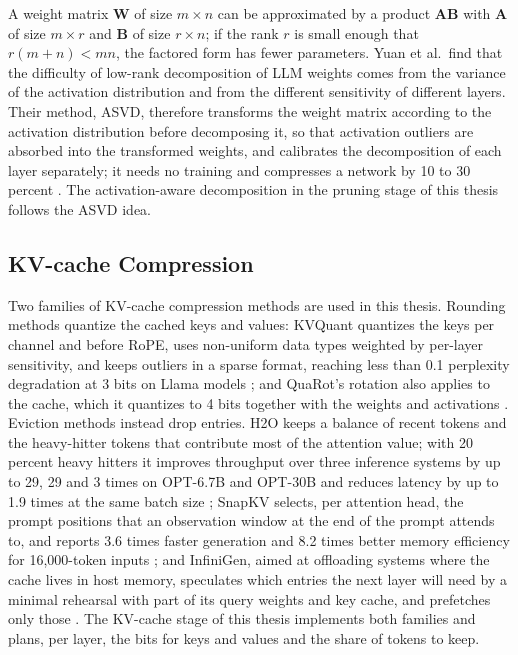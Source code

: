A weight matrix $\mathbf{W}$ of size $m \times n$ can be approximated by a product $\mathbf{A}\mathbf{B}$ with $\mathbf{A}$ of size $m \times r$ and $\mathbf{B}$ of size $r \times n$; if the rank $r$ is small enough that $r(m + n) < mn$, the factored form has fewer parameters. Yuan et al.\ find that the difficulty of low-rank decomposition of LLM weights comes from the variance of the activation distribution and from the different sensitivity of different layers. Their method, ASVD, therefore transforms the weight matrix according to the activation distribution before decomposing it, so that activation outliers are absorbed into the transformed weights, and calibrates the decomposition of each layer separately; it needs no training and compresses a network by 10 to 30 percent \cite{yuan2025asvd}. The activation-aware decomposition in the pruning stage of this thesis follows the ASVD idea.

\subsection{KV-cache Compression}
\label{sec:ch2-kvcompress}

Two families of KV-cache compression methods are used in this thesis. Rounding methods quantize the cached keys and values: KVQuant quantizes the keys per channel and before RoPE, uses non-uniform data types weighted by per-layer sensitivity, and keeps outliers in a sparse format, reaching less than 0.1 perplexity degradation at 3 bits on Llama models \cite{hooper2024kvquant}; and QuaRot's rotation also applies to the cache, which it quantizes to 4 bits together with the weights and activations \cite{ashkboos2024quarot}. Eviction methods instead drop entries. H2O keeps a balance of recent tokens and the heavy-hitter tokens that contribute most of the attention value; with 20 percent heavy hitters it improves throughput over three inference systems by up to 29, 29 and 3 times on OPT-6.7B and OPT-30B and reduces latency by up to 1.9 times at the same batch size \cite{zhang2023h2o}; SnapKV selects, per attention head, the prompt positions that an observation window at the end of the prompt attends to, and reports 3.6 times faster generation and 8.2 times better memory efficiency for 16{,}000-token inputs \cite{li2024snapkv}; and InfiniGen, aimed at offloading systems where the cache lives in host memory, speculates which entries the next layer will need by a minimal rehearsal with part of its query weights and key cache, and prefetches only those \cite{lee2024infinigen}. The KV-cache stage of this thesis implements both families and plans, per layer, the bits for keys and values and the share of tokens to keep.

